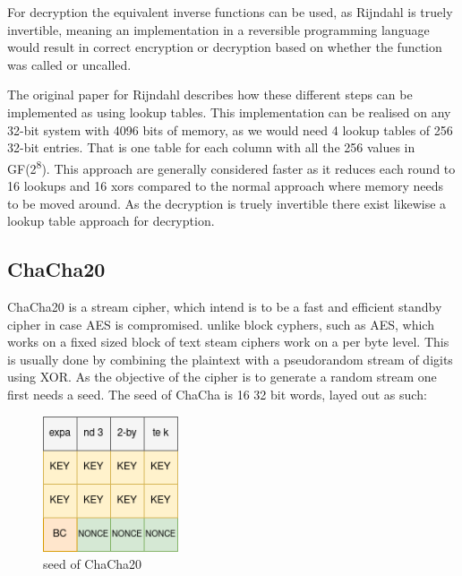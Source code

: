 \documentclass[a4paper]{article}
\begin{document}
For decryption the equivalent inverse functions can be used, as Rijndahl is truely invertible, meaning an implementation in a reversible programming language would result in correct encryption or decryption based on whether the function was called or uncalled.

The original paper for Rijndahl\cite{Rijndahl} describes how these different steps can be implemented as using lookup tables. This implementation can be realised on any 32-bit system with 4096 bits of memory, as we would need 4 lookup tables of 256 32-bit entries. That is one table for each column with all the 256 values in GF(2\textsuperscript{8}). This approach are generally considered faster as it reduces each round to 16 lookups and 16 xors compared to the normal approach where memory needs to be moved around. As the decryption is truely invertible there exist likewise a lookup table approach for decryption.
\subsection{ChaCha20}
\label{ChaChaalg}
ChaCha20 is a stream cipher, which intend is to be a fast and efficient standby cipher in case AES is compromised. unlike block cyphers, such as AES, which works on a fixed sized block of text steam ciphers work on a per byte level. This is usually done by combining the plaintext with a pseudorandom stream of digits using XOR. As the objective of the cipher is to generate a random stream one first needs a seed. The seed of ChaCha is 16 32 bit words, layed out as such:
\begin{figure}[htbp]
\centering
\includegraphics[width=4cm]{./Background/ChaChaSeed.png}
\caption{\label{fig:ChaChaSeed}seed of ChaCha20}
\end{figure}
\end{document}
